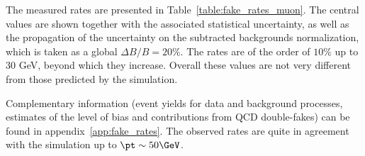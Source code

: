 The measured rates are presented in Table~\ref{table:fake_rates_muon}. 
The central values are shown together with the associated statistical uncertainty, 
as well as the propagation of the uncertainty on the subtracted backgrounds normalization, 
which is taken as a global $\Delta B/B=20\%$. 
The rates are of the order of $10\%$ up to 30 GeV, beyond which they increase. 
Overall these values are not very different from those predicted by the simulation. 

Complementary information (event yields for data and background processes, estimates of the level of bias and contributions from QCD double-fakes) 
can be found in appendix~\ref{app:fake_rates}. 
The observed rates are quite in agreement with the simulation up to $\pt\sim 50\GeV$. 

\begin{table}[t!]
\def\arraystretch{1.15}
\caption{Muon fake rate measured in data and the associated statistical uncertainty. 
The systematic uncertainty originating from the subtraction of ``backgrounds'' with only prompt leptons is also displayed. }
\label{table:fake_rates_muon}
\def\arraystretch{1.15}
\centering
{}



\end{table}

